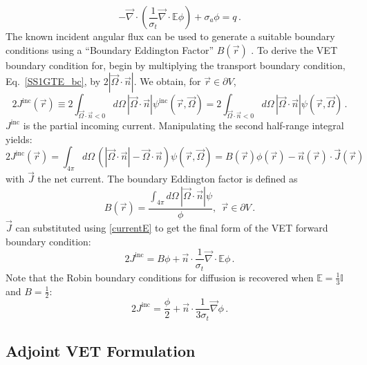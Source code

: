\documentclass[12pt]{report}
\newcommand{\vr}{\vec{r}}
\newcommand{\vJ}{\vec{J}}
\newcommand{\vO}{\vec{\Omega}}
\renewcommand{\div}{\vec{\nabla} \cdot}
\newcommand{\grad}{\vec{\nabla}}
\newcommand{\bound}{\partial V}
\newcommand{\vn}{\vec{n}}
\newcommand{\Edd}{\mathbb{E}}
\newcommand{\BEdd}{B}
\newcommand{\sigt}{\sigma_t}
\newcommand{\siga}{\sigma_a}
\newcommand{\scalSource}{q}
\begin{document}
\begin{equation}
\label{VEFForm}
- \div \left( \frac{1}{\sigt}\div \Edd \phi \right) + \siga \phi = \scalSource \,.
\end{equation}
The known incident angular flux can be used to generate a suitable boundary conditions using a 
``Boundary Eddington Factor'' $\BEdd(\vr)$ \cite{Miften}. To derive the VET boundary condition for, begin by multiplying the transport boundary condition,
Eq.~\eqref{SS1GTE_bc}, by $2 | \vO \cdot \vn |$. We obtain, for $\vr \in \bound$,
\begin{equation}
2 J^{\text{inc}}(\vr) \equiv  2 \int_{\vO \cdot \vn <0 }  d \Omega\, | \vO \cdot \vec{n} | \psi^{\text{inc}}(\vr,\vO) 
= 2\int_{\vO \cdot \vn <0 } d \Omega\,  | \vO \cdot \vn |  \psi(\vr,\vO) \,.
\end{equation}
$J^{\text{inc}}$ is the partial incoming current. 
Manipulating the second half-range integral yields:
\begin{equation}
2 J^{\text{inc}}(\vr) = \int_{4\pi} d \Omega\,  \left( | \vO \cdot \vn |- \vO\cdot\vn\right)  \psi(\vr,\vO) 
= \BEdd(\vr) \phi(\vr) - \vn(\vr) \cdot \vJ(\vr)
\end{equation}
with $\vJ$ the net current. The boundary Eddington factor is defined as
\begin{equation}
\BEdd(\vr) = \frac{\int_{4 \pi} d\Omega \, | \vO \cdot \vn | \psi}{\phi} ,\ \ \vr \in \bound \,.
\end{equation}
$\vJ$ can substituted using \eqref{currentE} to get the final form of the VET forward boundary condition:
\begin{equation}
2 J^{\text{inc}} = \BEdd \phi + \vn \cdot \frac{1}{\sigt} \div \Edd \phi \,.
\end{equation}
Note that the Robin boundary conditions for diffusion is recovered when $\Edd = \tfrac{1}{3} \mathbb{I}$ and $B=\tfrac{1}{2}$:
\[
2 J^{\text{inc}} = \frac{\phi}{2} + \vn \cdot \frac{1}{3\sigt} \grad \phi \,.
\]


\subsection{Adjoint VET Formulation}
\end{document}
